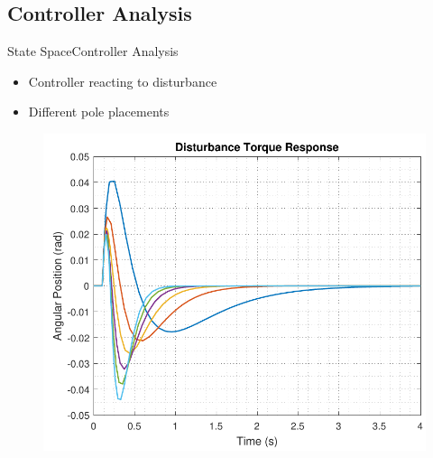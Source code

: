 \subsection{Controller Analysis}%
\begin{frame}{State Space}{Controller Analysis}
  \begin{itemize}
    \item Controller reacting to disturbance
    \item Different pole placements
  \end{itemize}
  \vspace{1cm}
  \hspace{0.03\linewidth}
  \begin{minipage}{\linewidth}
   	\begin{minipage}{0.45\linewidth}
   		\begin{figure}[H]
   			\includegraphics[scale=.35]{Pictures/disturbanceStateSpace}
   			\centering
   		\end{figure}
   	\end{minipage}
   	\hspace{0.03\linewidth}
   	\begin{minipage}{0.45\linewidth}
   		\begin{figure}[H]

\end{figure}
\end{minipage}
\end{minipage}
\end{frame}
